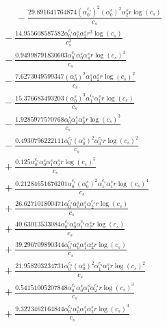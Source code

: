 \documentclass[10pt]{article}
\begin{document}
\begin{align*}
\phantom{R_{2,8}} &\phantom{={}}{}  - \frac{29.891641764874 \left(\alpha_{0}^{c_s}\right)^{2} \left(\alpha_{0}^s\right)^{2} \alpha_{2}^s r \log{\left(c_{s} \right)}}{c_{s}} \\
&{}  - \frac{14.955608587582 \alpha_{0}^{c_s} \alpha_{0}^s \alpha_{2}^s r^{3} \log{\left(c_{s} \right)}}{c_{s}^{3}} \\
&{}  - \frac{0.94998791830603 \alpha_{0}^{c_s} \alpha_{0}^s \alpha_{4}^s r \log{\left(c_{s} \right)}^{3}}{c_{s}} \\
&{}  - \frac{7.6273049599347 \left(\alpha_{0}^s\right)^{2} \alpha_{1}^s \alpha_{2}^s r \log{\left(c_{s} \right)}^{2}}{c_{s}} \\
&{}  - \frac{15.376683493203 \left(\alpha_{0}^s\right)^{3} \alpha_{1}^{c_s} \alpha_{1}^s r \log{\left(c_{s} \right)}}{c_{s}} \\
&{}  - \frac{1.9285977570768 \alpha_{0}^s \alpha_{1}^s \alpha_{3}^s r \log{\left(c_{s} \right)}^{3}}{c_{s}} \\
&{}  - \frac{0.4930796222111 \alpha_{0}^{c_s} \left(\alpha_{0}^s\right)^{2} \alpha_{3}^{c_s} r \log{\left(c_{s} \right)}^{2}}{c_{s}} \\
&{}  + \frac{0.125 \alpha_{0}^{c_s} \alpha_{0}^s \alpha_{1}^s \alpha_{2}^s r \log{\left(c_{s} \right)}^{5}}{c_{s}} \\
&{}  + \frac{0.21284651676201 \alpha_{0}^{c_s} \left(\alpha_{0}^s\right)^{2} \alpha_{1}^{c_s} \alpha_{1}^s r \log{\left(c_{s} \right)}^{4}}{c_{s}} \\
&{}  + \frac{26.627101800471 \alpha_{0}^{c_s} \alpha_{0}^s \alpha_{1}^s \alpha_{2}^{c_s} r \log{\left(c_{s} \right)}}{c_{s}} \\
&{}  + \frac{40.63013533084 \alpha_{0}^{c_s} \alpha_{0}^s \alpha_{1}^{c_s} \alpha_{2}^s r \log{\left(c_{s} \right)}}{c_{s}} \\
&{}  + \frac{39.296709890344 \alpha_{0}^{c_s} \alpha_{0}^s \alpha_{1}^s \alpha_{2}^s r \log{\left(c_{s} \right)}}{c_{s}} \\
&{}  + \frac{21.958203234731 \alpha_{0}^{c_s} \left(\alpha_{0}^s\right)^{2} \alpha_{1}^{c_s} \alpha_{1}^s r \log{\left(c_{s} \right)}^{2}}{c_{s}} \\
&{}  + \frac{0.54151005207848 \alpha_{0}^{c_s} \alpha_{0}^s \alpha_{1}^s \alpha_{2}^{c_s} r \log{\left(c_{s} \right)}^{3}}{c_{s}} \\
&{}  + \frac{9.3223462164844 \alpha_{0}^{c_s} \alpha_{0}^s \alpha_{1}^s \alpha_{2}^s r \log{\left(c_{s} \right)}^{3}}{c_{s}} \\

\end{align*}
\end{document}
